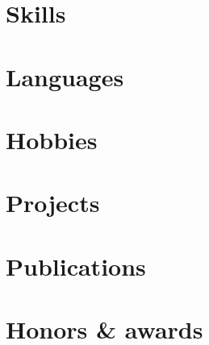 \documentclass[]{template}
\begin{document}
\begin{minipage}[t]{0.25\textwidth}


\section{Skills}
\sectionsep


\section{Languages}
\sectionsep


\section{Hobbies}
\sectionsep

\end{minipage}

\newpage

%
%

\begin{minipage}[t]{0.90\textwidth} 


\section{Projects}
\sectionsep


\section{Publications}
\sectionsep


\section{Honors \& awards}
\sectionsep

\end{minipage} 
\hfill
\end{document}
